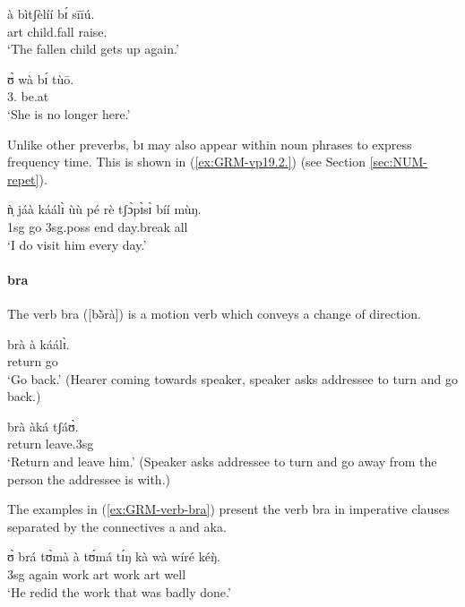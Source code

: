 \begin{exe}
\begin{exe}
\begin{exe}
\begin{exe}
\begin{exe}
\begin{exe}
\begin{exe}
\begin{exe}
\begin{exe}
\begin{exe}
\begin{exe}
\begin{exe}
\ex\label{ex:GRM-vp10.4}
\gll à bìtʃèlíí bɪ́ sīīú.\\
 {\sc art}  child.fall   {\itr} raise.{\foc}\\
\glt  `The fallen child gets up again.' 

\ex\label{ex:vp10.4.}
\gll ʊ̀ wà bɪ́ tùō.\\
    {3.\sg} {\neg} {\itr} be.at\\
\glt  `She is no longer here.' 

\z 
 \z 
 
 
Unlike other preverbs,  {\sls bɪ} may also appear within noun phrases to express frequency time. This is shown in (\ref{ex:GRM-vp19.2.}) (see Section \ref{sec:NUM-repet}).


\ea\label{ex:GRM-vp19.2.}
\gll  ǹ̩ jáà  káálɪ̀ ùù pé rè tʃɔ̀pɪ̀sɪ̀ bíí mùŋ.\\
{\sc 1sg} {\hab} go {\sc 3sg.poss} end {\foc}  day.break {\itr} all\\
\glt  `I do visit him every day.' 
\z 

 \paragraph{bra}
\label{sec:GRM-preverb-return}

The verb {\sls bra} ([{\sls bə̆̀rà}]) is  a motion verb which conveys a change of direction.

\ea\label{ex:GRM-verb-bra}
\ea
\gll brà à káálɪ̀.\\
return {\conn} go\\
\glt `Go back.' (Hearer coming towards speaker, speaker asks addressee to turn and go back.)

\ex
\gll brà àká tʃáʊ̀.\\
return {\conn} leave.{\sc 3sg}\\
\glt `Return and leave him.' (Speaker asks addressee to turn and go away from the person the addressee is with.)

\z 
 \z

The examples in (\ref{ex:GRM-verb-bra}) present the verb {\sls bra} in imperative clauses separated by the connectives {\sls a} and {\sls aka}. 

\ea\label{ex:vp33.1.}
\gll ʊ̀ brá tʊ̀mà à tʊ́má tɪ́ŋ kà wà wíré kéŋ̀.\\
 {\sc 3sg}  {again}  {work} {\sc art} {work}   {\sc art} {\egr} {\neg} well {\dxm}\\
\glt  `He redid the work that was badly done.'
\z



\end{exe}
\end{exe}
\end{exe}
\end{exe}
\end{exe}
\end{exe}
\end{exe}
\end{exe}
\end{exe}
\end{exe}
\end{exe}
\end{exe}
